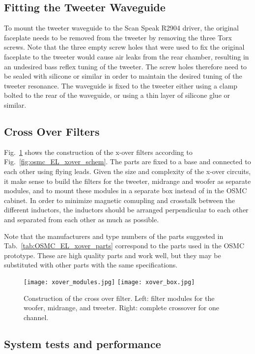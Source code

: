 \documentclass[12pt,a4paper]{article}
\providecommand{\figr}[1]{Fig.~\ref{fig:#1}}
\providecommand{\figlabel}[1]{\label{fig:#1}}
\providecommand{\tabl}[1]{Tab.~\ref{tab:#1}}
\begin{document}
\subsection{Fitting the Tweeter Waveguide}
To mount the tweeter waveguide to the Scan Speak R2904 driver, the original faceplate needs to be removed from the tweeter by removing the three Torx screws. Note that the three empty screw holes that were used to fix the original faceplate to the tweeter would cause air leaks from the rear chamber, resulting in an undesired bass reflex tuning of the tweeter.\cite{scan_waveguide_bassreflex} The screw holes therefore need to be sealed with silicone or similar in order to maintain the desired tuning of the tweeter resonance.\cite{scan_waveguide_seal} The waveguide is fixed to the tweeter either using a clamp bolted to the rear of the waveguide, or using a thin layer of silicone glue or similar.


\subsection{Cross Over Filters}
\figr{osmc_xover_construction} shows the construction of the x-over filters according to \figr{osmc_EL_xover_schem}. The parts are fixed to a base and connected to each other using flying leads. Given the size and complexity of the x-over circuits, it make sense to build the filters for the tweeter, midrange and woofer as separate modules, and to mount these modules in a separate box instead of in the OSMC cabinet. In order to minimize magnetic comupling and crosstalk between the different inductors, the inductors should be arranged perpendicular to each other and separated from each other as much as possible.\cite{osmc_p833}

Note that the manufacturers and type numbers of the parts suggested in \tabl{OSMC_EL_xover_parts} correspond to the parts used in the OSMC prototype. These are high quality parts and work well, but they may be substituted with other parts with the same specifications.


\begin{figure}[tbp]
	\centering
	\texttt{[image: xover\_modules.jpg]}
	\hfill
	\texttt{[image: xover\_box.jpg]}
	\caption{Construction of the cross over filter. Left: filter modules for the woofer, midrange, and tweeter. Right: complete crossover for one channel.}
	\figlabel{osmc_xover_construction}
\end{figure}


\subsection{System tests and performance}
\end{document}
